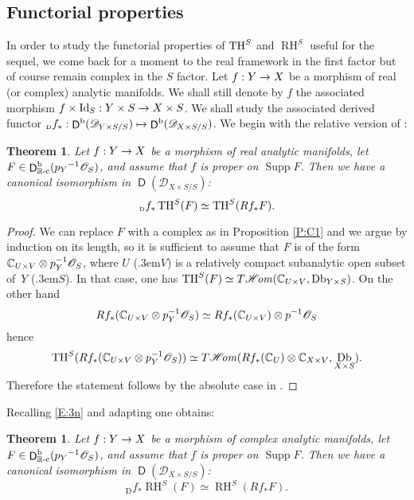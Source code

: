 \documentclass[english]{smfart}
\numberwithin{subsection}{section}
\def\shd{\mathcal{D}}\let\cD\shd
\def\sho{\mathcal{O}}\let\cO\sho
\newcommand{\R}{\mathbb{R}}\let\RR\R
\DeclareMathOperator{\RH}{RH}
\newcommand{\rb}{\mathrm{b}}
\newcommand{\rc}{{\R\textup{-c}}}
\newcommand{\XS}{X\times S}
\newcommand{\DXS}{\shd_{\XS/S}}
\newcommand{\DYS}{\shd_{Y\times S/S}}
\DeclareMathOperator{\rD}{\mathsf{D}}
\DeclareMathOperator{\Db}{\mathfrak{Db}}
\DeclareMathOperator{\id}{Id}\let\Id\id
\DeclareMathOperator{\supp}{Supp}
\def\resp{\text{resp.}\kern.3em}
\newcommand{\Df}{{}_{\scriptscriptstyle\mathrm{D}}f}
\newcommand{\pOS}{p^{-1}\sho_S}
\numberwithin{equation}{section}
\theoremstyle{plain}
\newtheorem{theorem}[equation]{Theorem}
\newtheorem{proposition}[equation]{Proposition}
\theoremstyle{definition}
\def\to{\mathchoice{\longrightarrow}{\rightarrow}{\rightarrow}{\rightarrow}}
\def\mto{\mathchoice{\longmapsto}{\mapsto}{\mapsto}{\mapsto}}
\begin{document}
\subsection{Functorial properties}\label{subsec:functorialprop}
In order to study the functorial properties of $\operatorname{TH}^S$ and $\RH^S$ useful for the sequel, we come back for a moment to the real framework in the first factor but of course remain complex in the $S$ factor.
Let $f:Y\to X$ be a morphism of real (or complex) analytic manifolds. We shall still denote by $f$ the associated morphism $f\times \id_S: Y\times S\to \XS$. We shall study the associated derived functor $\Df_*:\rD^\rb(\DYS)\mto\rD^\rb(\DXS)$. We begin with the relative version of \cite[Th.\,4.1]{Kashiwara84}:

\begin{theorem}\label{L:A3}
Let $f:Y\to X$ be a morphism of real analytic manifolds, let $F\in \rD^{\rb}_\rc({p_Y}^{-1}\sho_S)$, and assume that $f$ is proper on $\supp F$. Then we have a canonical isomorphism in $\rD(\DXS)$:
$$\Df_*\TH^S(F)\simeq \TH^S(Rf_*F).
$$
\end{theorem}

\begin{proof}
We can replace $F$ with a complex as in Proposition \ref{P:C1} and we argue by induction on its length, so it is sufficient to assume that $F$ is of the form $\CC_{U\times V}\otimes p_Y^{-1}\sho_S$, where $U$ (\resp $V$) is a relatively compact subanalytic open subset of~$Y$ (\resp $S$). In that case, one has $\TH^S(F)\simeq T\ho(\CC_{U\times V}, \Db_{Y\times S})$. On the other hand
$$Rf_*(\CC_{U\times V}\otimes p^{-1}_Y\sho_S)\simeq Rf_*(\CC_{U\times V})\otimes \pOS$$ hence
$$\TH^S(Rf_*(\CC_{U\times V}\otimes p^{-1}_Y\sho_S))\simeq T\ho(Rf_*(\CC_{U})\otimes \CC_{X\times V}, \Db_{\XS}).$$ Therefore the statement follows by the absolute case in \cite[Th.\,4.1]{Kashiwara84}.
\end{proof}

Recalling \eqref{E:3n} and adapting \cite[Lem.\,7.2]{Kashiwara84} one obtains:

\begin{theorem}\label{L:A4}
Let $f:Y\to X$ be a morphism of complex analytic manifolds, let $F\in \rD^{\rb}_\rc({p_Y}^{-1}\sho_S)$, and assume that $f$ is proper on $\supp F$. Then we have a canonical isomorphism in $\rD(\shd_{\XS/ S})$:
$$\Df_*\RH^S(F)\simeq \RH^S(Rf_*F).$$
\end{theorem}

\begin{comment}
Using Proposition \ref{P:C1}, Theorem \ref{L:A4} together with the line of proof of \cite[Th.\,5.8(ii) \& Prop.\,5.9]{K-S96}, we can conclude:

\begin{proposition}\label{P-ind}
Let $f:Y\to X$ be a morphism of complex analytic manifolds and let $F\in \rD^{\rb}_\rc({p_Y}^{-1}\sho_S)$. Then we have a natural morphism in $\rD(\shd_{\XS/ S})$
$$\Df^*\RH^S(F)[-d_X]\to \RH^S(f^{-1}F)[-d_Y],$$
which is an isomorphism if $f$ is a closed embedding.
\end{proposition}
\end{comment}
\end{document}
